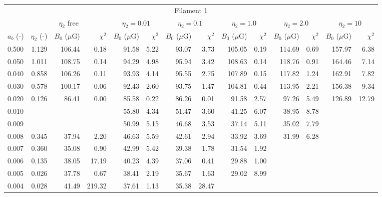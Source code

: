 \begin{tabular}{@{}lrrrrrrrrrrrrr@{}}
\toprule
\multicolumn{14}{c}{Filament 1} \\
\cmidrule{1-14}
{} & \multicolumn{3}{c}{$\eta_2$ free} & \multicolumn{2}{c}{$\eta_2 = 0.01$}
   & \multicolumn{2}{c}{$\eta_2 = 0.1$} & \multicolumn{2}{c}{$\eta_2 = 1.0$}
   & \multicolumn{2}{c}{$\eta_2 = 2.0$} & \multicolumn{2}{c}{$\eta_2 = 10$} \\
\cmidrule(lr){2-4} \cmidrule(lr){5-6} \cmidrule(lr){7-8} \cmidrule(lr){9-10}
    \cmidrule(lr){11-12} \cmidrule(lr){13-14}
$a_b$ (-) & $\eta_2$ (-) & $B_0$ ($\mu$G) & $\chi^2$
& $B_0$ ($\mu$G) & $\chi^2$ & $B_0$ ($\mu$G) & $\chi^2$
& $B_0$ ($\mu$G) & $\chi^2$ & $B_0$ ($\mu$G) & $\chi^2$
& $B_0$ ($\mu$G) & $\chi^2$ \\
\cmidrule{1-14}
0.500 & 1.129 & 106.44 &   0.18 & 91.58 & 5.22 & 93.07 &  3.73 & 105.05 & 0.19 & 114.69 & 0.69 & 157.97 & 6.38 \\
0.050 & 1.011 & 108.75 &   0.14 & 94.29 & 4.98 & 95.94 &  3.42 & 108.63 & 0.14 & 118.76 & 0.91 & 164.46 & 7.14 \\
0.040 & 0.858 & 106.26 &   0.11 & 93.93 & 4.14 & 95.55 &  2.75 & 107.89 & 0.15 & 117.82 & 1.24 & 162.91 & 7.82 \\
0.030 & 0.578 & 100.17 &   0.06 & 92.43 & 2.60 & 93.75 &  1.47 & 104.81 & 0.44 & 113.95 & 2.21 & 156.38 & 9.34 \\
0.020 & 0.126 &  86.41 &   0.00 & 85.58 & 0.22 & 86.26 &  0.01 &  91.58 & 2.57 &  97.26 & 5.49 & 126.89 & 12.79 \\
0.010 &       &        &        & 55.80 & 4.34 & 51.47 &  3.60 &  41.25 & 6.07 &  38.95 & 8.78 &       &  \\
0.009 &       &        &        & 50.99 & 5.15 & 46.68 &  3.53 &  37.14 & 5.11 &  35.02 & 7.79 &       &  \\
0.008 & 0.345 &  37.94 &   2.20 & 46.63 & 5.59 & 42.61 &  2.94 &  33.92 & 3.69 &  31.99 & 6.28 &       &  \\
0.007 & 0.360 &  35.08 &   0.90 & 42.99 & 5.42 & 39.38 &  1.78 &  31.54 & 1.92 &        &      &       &  \\
0.006 & 0.135 &  38.05 &  17.19 & 40.23 & 4.39 & 37.06 &  0.41 &  29.88 & 1.00 &        &      &       &  \\
0.005 & 0.026 &  37.78 &   0.67 & 38.41 & 2.19 & 35.67 &  1.63 &  29.02 & 8.99 &        &      &       &  \\
0.004 & 0.028 &  41.49 & 219.32 & 37.61 & 1.13 & 35.38 & 28.47 &        &      &        &      &       &  \\


\end{tabular}
